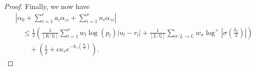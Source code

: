 \begin{proof}
Finally, we now have
\begin{align*}
& \left|\alpha_0+\sum_{i = 1}^r a_i \alpha_{\varepsilon i} + \sum_{i = 1}^{\nu} n_i \alpha_{\gamma i}\right| \\
	& \quad \leq \frac{1}{2}\left(\frac{1}{[K:\mathbb{Q}]}\sum_{l = 1}^{\nu}w_l \log(p_l)|u_l - r_l| + \frac{1}{[L:\mathbb{Q}]}\sum_{\sigma :L \to \mathbb{C}} w_{\sigma}\log^+ \left|\sigma\left(\frac{\delta_2}{\lambda}\right)\right| \right)\\
	&\quad\quad + \left(\frac{1}{2} + c\kappa_{\tau}e^{-h_{\tau}\left(\frac{\delta_2}{\lambda}\right)}\right).
\end{align*} 

%
%

\end{proof}
